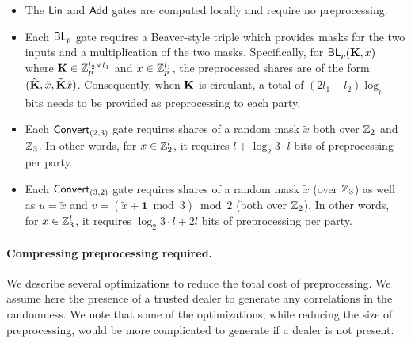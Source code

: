 \begin{itemize}
\item The $\textnormal{\textsf{Lin}}$ and $\textnormal{\textsf{Add}}$ gates are computed locally and require no preprocessing.

\item Each $\textnormal{\textsf{BL}}_p$ gate requires a Beaver-style triple which provides masks for the two inputs and a multiplication of the two masks. Specifically, for $\BLMap_p(\mat{K}, x)$ where $\mat{K} \in \Z_p^{l_2 \times l_1}$ and $x \in \mathbb{Z}_p^{l_1}$, the preprocessed shares are of the form $(\tilde{\mat{K}}, \tilde{x}, \tilde{\mat{K}}\tilde{x})$. Consequently, when $\mat{K}$ is circulant, a total of $(2l_1 + l_2) \log_p$ bits needs to be provided as preprocessing to each party.

\item Each $\textnormal{\textsf{Convert}}_{(2,3)}$ gate requires shares of a random mask $\tilde{x}$ both over $\mathbb{Z}_2$ and $\mathbb{Z}_3$. In other words, for $x \in \mathbb{Z}_2^l$, it requires $l + \log_2{3} \cdot l$ bits of preprocessing per party.

\item Each $\textnormal{\textsf{Convert}}_{(3,2)}$ gate requires shares of a random mask $\tilde{x}$ (over $\mathbb{Z}_3$) as well as $u = \tilde{x}$ and $v = (\tilde{x} + \textbf{1} \bmod 3)\bmod 2$ (both over $\mathbb{Z}_2$). In other words, for $x \in \mathbb{Z}_3^l$, it requires $\log_2{3} \cdot l + 2l$ bits of preprocessing per party.
\end{itemize}

\paragraph{Compressing preprocessing required.}
We describe several optimizations to reduce the total cost of preprocessing. We assume here the presence of a trusted dealer to generate any correlations in the randomness. We note that some of the optimizations, while reducing the size of preprocessing, would be more complicated to generate if a dealer is not present.

